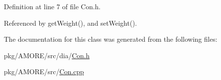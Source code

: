 Definition at line 7 of file Con.h.



Referenced by getWeight(), and setWeight().



The documentation for this class was generated from the following files:\begin{DoxyCompactItemize}
\item 
pkg/AMORE/src/dia/\hyperlink{_con_8h}{Con.h}\item 
pkg/AMORE/src/\hyperlink{_con_8cpp}{Con.cpp}\end{DoxyCompactItemize}
